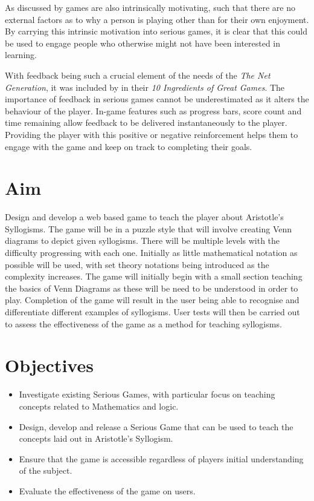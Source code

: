 \documentclass[12pt,a4paper]{report}
\begin{document}
As discussed by \cite{malone1981toward} games are also intrinsically motivating, such that there are no external factors as to why a person is playing other than for their own enjoyment. By carrying this intrinsic motivation into serious games, it is clear that this could be used to engage people who otherwise might not have been interested in learning. 

With feedback being such a crucial element of the needs of the \textit{The Net Generation}, it was included by \cite{reeves2013total} in their \textit{10 Ingredients of Great Games}. The importance of feedback in serious games cannot be underestimated as it alters the behaviour of the player. In-game features such as progress bars, score count and time remaining allow feedback to be delivered instantaneously to the player. Providing the player with this positive or negative reinforcement helps them to engage with the game and keep on track to completing their goals. 

\section{Aim}
Design and develop a web based game to teach the player about Aristotle's Syllogisms. The game will be in a puzzle style that will involve creating Venn diagrams to depict given syllogisms. There will be multiple levels with the difficulty progressing with each one. Initially as little mathematical notation as possible will be used, with set theory notations being introduced as the complexity increases. The game will initially begin with a small section teaching the basics of Venn Diagrams as these will be need to be understood in order to play. Completion of the game will result in the user being able to recognise and differentiate different examples of syllogisms. User tests will then be carried out to assess the effectiveness of the game as a method for teaching syllogisms. 
\section{Objectives}
\begin{itemize}
  \item Investigate existing Serious Games, with particular focus on teaching concepts related to Mathematics and logic.

  \item Design, develop and release a Serious Game that can be used to teach the concepts laid out in Aristotle's Syllogism.
  
  \item Ensure that the game is accessible regardless of players initial understanding of the subject.
  \item Evaluate the effectiveness of the game on users.
  
\end{itemize}
\end{document}
